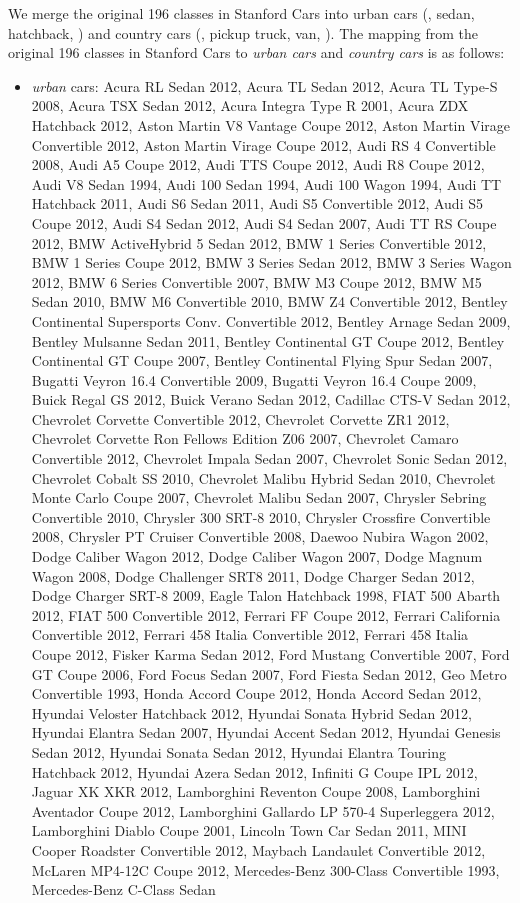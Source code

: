 \documentclass[10pt,twocolumn,letterpaper]{article}
\begin{document}
We merge the original 196 classes in Stanford Cars into urban cars (\eg, sedan, hatchback, \etc) and country cars (\eg, pickup truck, van, \etc).  The mapping from the original 196 classes in Stanford Cars to \textit{urban cars} and \textit{country cars} is as follows:
\begin{itemize}[noitemsep,topsep=0pt]
    \item \textit{urban} cars: Acura RL Sedan 2012, Acura TL Sedan 2012, Acura TL Type-S 2008, Acura TSX Sedan 2012, Acura Integra Type R 2001, Acura ZDX Hatchback 2012, Aston Martin V8 Vantage Coupe 2012, Aston Martin Virage Convertible 2012, Aston Martin Virage Coupe 2012, Audi RS 4 Convertible 2008, Audi A5 Coupe 2012, Audi TTS Coupe 2012, Audi R8 Coupe 2012, Audi V8 Sedan 1994, Audi 100 Sedan 1994, Audi 100 Wagon 1994, Audi TT Hatchback 2011, Audi S6 Sedan 2011, Audi S5 Convertible 2012, Audi S5 Coupe 2012, Audi S4 Sedan 2012, Audi S4 Sedan 2007, Audi TT RS Coupe 2012, BMW ActiveHybrid 5 Sedan 2012, BMW 1 Series Convertible 2012, BMW 1 Series Coupe 2012, BMW 3 Series Sedan 2012, BMW 3 Series Wagon 2012, BMW 6 Series Convertible 2007, BMW M3 Coupe 2012, BMW M5 Sedan 2010, BMW M6 Convertible 2010, BMW Z4 Convertible 2012, Bentley Continental Supersports Conv. Convertible 2012, Bentley Arnage Sedan 2009, Bentley Mulsanne Sedan 2011, Bentley Continental GT Coupe 2012, Bentley Continental GT Coupe 2007, Bentley Continental Flying Spur Sedan 2007, Bugatti Veyron 16.4 Convertible 2009, Bugatti Veyron 16.4 Coupe 2009, Buick Regal GS 2012, Buick Verano Sedan 2012, Cadillac CTS-V Sedan 2012, Chevrolet Corvette Convertible 2012, Chevrolet Corvette ZR1 2012, Chevrolet Corvette Ron Fellows Edition Z06 2007, Chevrolet Camaro Convertible 2012, Chevrolet Impala Sedan 2007, Chevrolet Sonic Sedan 2012, Chevrolet Cobalt SS 2010, Chevrolet Malibu Hybrid Sedan 2010, Chevrolet Monte Carlo Coupe 2007, Chevrolet Malibu Sedan 2007, Chrysler Sebring Convertible 2010, Chrysler 300 SRT-8 2010, Chrysler Crossfire Convertible 2008, Chrysler PT Cruiser Convertible 2008, Daewoo Nubira Wagon 2002, Dodge Caliber Wagon 2012, Dodge Caliber Wagon 2007, Dodge Magnum Wagon 2008, Dodge Challenger SRT8 2011, Dodge Charger Sedan 2012, Dodge Charger SRT-8 2009, Eagle Talon Hatchback 1998, FIAT 500 Abarth 2012, FIAT 500 Convertible 2012, Ferrari FF Coupe 2012, Ferrari California Convertible 2012, Ferrari 458 Italia Convertible 2012, Ferrari 458 Italia Coupe 2012, Fisker Karma Sedan 2012, Ford Mustang Convertible 2007, Ford GT Coupe 2006, Ford Focus Sedan 2007, Ford Fiesta Sedan 2012, Geo Metro Convertible 1993, Honda Accord Coupe 2012, Honda Accord Sedan 2012, Hyundai Veloster Hatchback 2012, Hyundai Sonata Hybrid Sedan 2012, Hyundai Elantra Sedan 2007, Hyundai Accent Sedan 2012, Hyundai Genesis Sedan 2012, Hyundai Sonata Sedan 2012, Hyundai Elantra Touring Hatchback 2012, Hyundai Azera Sedan 2012, Infiniti G Coupe IPL 2012, Jaguar XK XKR 2012, Lamborghini Reventon Coupe 2008, Lamborghini Aventador Coupe 2012, Lamborghini Gallardo LP 570-4 Superleggera 2012, Lamborghini Diablo Coupe 2001, Lincoln Town Car Sedan 2011, MINI Cooper Roadster Convertible 2012, Maybach Landaulet Convertible 2012, McLaren MP4-12C Coupe 2012, Mercedes-Benz 300-Class Convertible 1993, Mercedes-Benz C-Class Sedan 
\end{itemize}
\end{document}
